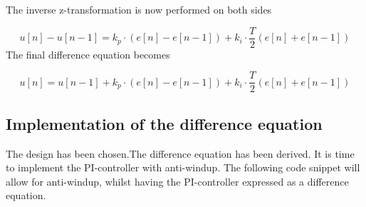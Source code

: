 \documentclass[../../../main]{subfiles}
\begin{document}
The inverse z-transformation is now performed on both sides

$$
  u[n]-u[n-1] =  k_p \cdot (e[n] - e[n-1])  + k_i \cdot \frac{T}{2}(e[n] + e[n-1])
$$
The final difference equation becomes

$$
  u[n] = u[n-1] + k_p \cdot (e[n] - e[n-1])  + k_i \cdot \frac{T}{2}(e[n] + e[n-1])
$$



\subsection{Implementation of the difference equation}
The design has been chosen.The difference equation has been derived.
It is time to implement the PI-controller with anti-windup.
The following code snippet will allow for anti-windup, whilst having the PI-controller expressed as a difference equation.

\end{document}
